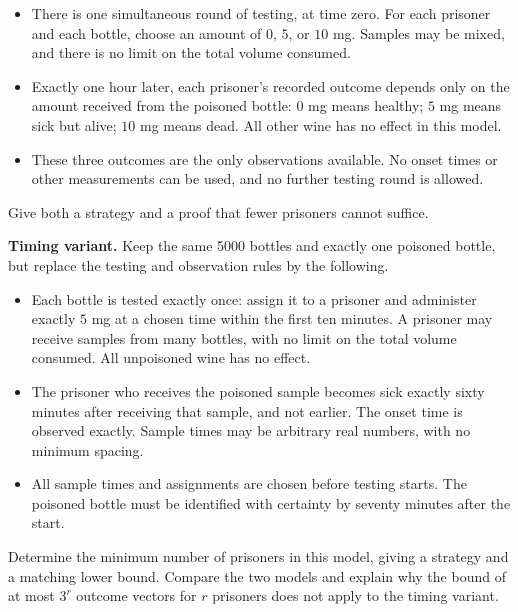\documentclass[12pt]{article}
\begin{document}
\begin{enumerate}
    \begin{itemize}
        \item There is one simultaneous round of testing, at time zero. For each prisoner and each bottle, choose an amount of \(0\), \(5\), or \(10\) mg. Samples may be mixed, and there is no limit on the total volume consumed.
        \item Exactly one hour later, each prisoner's recorded outcome depends only on the amount received from the poisoned bottle: \(0\) mg means healthy; \(5\) mg means sick but alive; \(10\) mg means dead. All other wine has no effect in this model.
        \item These three outcomes are the only observations available. No onset times or other measurements can be used, and no further testing round is allowed.
    \end{itemize}
    Give both a strategy and a proof that fewer prisoners cannot suffice.


    \newpage
    \noindent\textbf{Timing variant.} Keep the same 5000 bottles and exactly one poisoned bottle, but replace the testing and observation rules by the following.
    \begin{itemize}
        \item Each bottle is tested exactly once: assign it to a prisoner and administer exactly \(5\) mg at a chosen time within the first ten minutes. A prisoner may receive samples from many bottles, with no limit on the total volume consumed. All unpoisoned wine has no effect.
        \item The prisoner who receives the poisoned sample becomes sick exactly sixty minutes after receiving that sample, and not earlier. The onset time is observed exactly. Sample times may be arbitrary real numbers, with no minimum spacing.
        \item All sample times and assignments are chosen before testing starts. The poisoned bottle must be identified with certainty by seventy minutes after the start.
    \end{itemize}
    Determine the minimum number of prisoners in this model, giving a strategy and a matching lower bound. Compare the two models and explain why the bound of at most \(3^r\) outcome vectors for \(r\) prisoners does not apply to the timing variant.
\end{enumerate}
\end{document}
